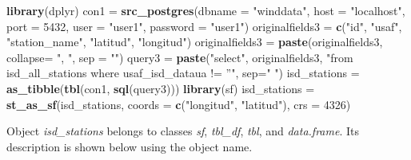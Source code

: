 \documentclass[12pt,twoside]{reedthesis}
\newenvironment{Shaded}{\begin{snugshade}}{\end{snugshade}}
\newcommand{\DataTypeTok}[1]{\textcolor[rgb]{0.13,0.29,0.53}{#1}}
\newcommand{\DecValTok}[1]{\textcolor[rgb]{0.00,0.00,0.81}{#1}}
\newcommand{\KeywordTok}[1]{\textcolor[rgb]{0.13,0.29,0.53}{\textbf{#1}}}
\newcommand{\NormalTok}[1]{#1}
\newcommand{\StringTok}[1]{\textcolor[rgb]{0.31,0.60,0.02}{#1}}
\begin{document}
\vspace{0.4cm}
\begin{Shaded}
\begin{Highlighting}[]
    \KeywordTok{library}\NormalTok{(dplyr)}
\NormalTok{    con1 =}\StringTok{ }\KeywordTok{src_postgres}\NormalTok{(}\DataTypeTok{dbname =} \StringTok{"winddata"}\NormalTok{, }\DataTypeTok{host =} \StringTok{"localhost"}\NormalTok{, }
                        \DataTypeTok{port =} \DecValTok{5432}\NormalTok{, }\DataTypeTok{user =} \StringTok{"user1"}\NormalTok{, }\DataTypeTok{password =} \StringTok{"user1"}\NormalTok{)}
\NormalTok{    originalfields3 =}\StringTok{ }\KeywordTok{c}\NormalTok{(}\StringTok{"id"}\NormalTok{, }\StringTok{"usaf"}\NormalTok{, }\StringTok{"station_name"}\NormalTok{, }\StringTok{"latitud"}\NormalTok{, }\StringTok{"longitud"}\NormalTok{)}
\NormalTok{    originalfields3 =}\StringTok{ }\KeywordTok{paste}\NormalTok{(originalfields3, }\DataTypeTok{collapse=} \StringTok{", "}\NormalTok{, }\DataTypeTok{sep =} \StringTok{""}\NormalTok{)}
\NormalTok{    query3 =}\StringTok{ }\KeywordTok{paste}\NormalTok{(}\StringTok{"select"}\NormalTok{, originalfields3, }
                   \StringTok{"from isd_all_stations where usaf_isd_dataua != ''"}\NormalTok{, }\DataTypeTok{sep=}\StringTok{" "}\NormalTok{)}
\NormalTok{    isd_stations =}\StringTok{ }\KeywordTok{as_tibble}\NormalTok{(}\KeywordTok{tbl}\NormalTok{(con1, }\KeywordTok{sql}\NormalTok{(query3)))}
    \KeywordTok{library}\NormalTok{(sf)}
\NormalTok{    isd_stations =}\StringTok{ }\KeywordTok{st_as_sf}\NormalTok{(isd_stations, }\DataTypeTok{coords =} \KeywordTok{c}\NormalTok{(}\StringTok{"longitud"}\NormalTok{, }\StringTok{"latitud"}\NormalTok{), }\DataTypeTok{crs =} \DecValTok{4326}\NormalTok{)}
\end{Highlighting}
\end{Shaded}
\normalsize

Object \emph{isd\_stations} belongs to classes \emph{sf}, \emph{tbl\_df}, \emph{tbl}, and \emph{data.frame}. Its description is shown below using the object name.

\scriptsize
\end{document}
